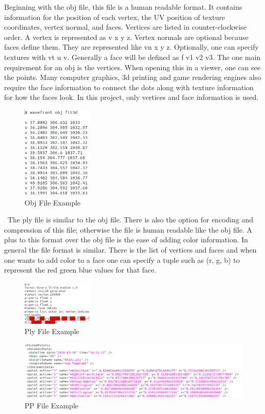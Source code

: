 Beginning with the obj file, this file is a human readable format. It contains information for the position of each vertex, the UV position of texture coordinates, vertex normal, and faces. Vertices are listed in counter-clockwise order. A vertex is represented as v x y z. Vertex normals are optional because faces define them. They are represented like vn x y z. Optionally, one can specify textures with vt u v. Generally a face will be defined as f v1 v2 v3. The one main requirement for an obj is the vertices. When opening this in a viewer, one can see the points. Many computer graphics, 3d printing and game rendering engines also require the face information to connect the dots along with texture information for how the faces look. In this project, only vertices and face information is used.
\begin{figure}[!htb]
	\caption{Obj File Example}
	\centering
	\includegraphics[width=0.3\textwidth]{images/obj_file.png}
\end{figure}
\
The ply file is similar to the obj file. There is also the option for encoding and compression of this file; otherwise the file is human readable like the obj file. A plus to this format over the obj file is the ease of adding color information. In general the file format is similar. There is the list of vertices and faces and when one wants to add color to a face one can specify a tuple such as (r, g, b) to represent the red green blue values for that face. 

\begin{figure}[!htb]
	\caption{Ply File Example}
	\centering
	\includegraphics[width=0.3\textwidth]{images/ply_file.png}
\end{figure}
\begin{figure}[!htb]
	\caption{PP File Example}
	\centering
	\includegraphics[width=1.1\textwidth]{images/pp_file.png}
\end{figure}

